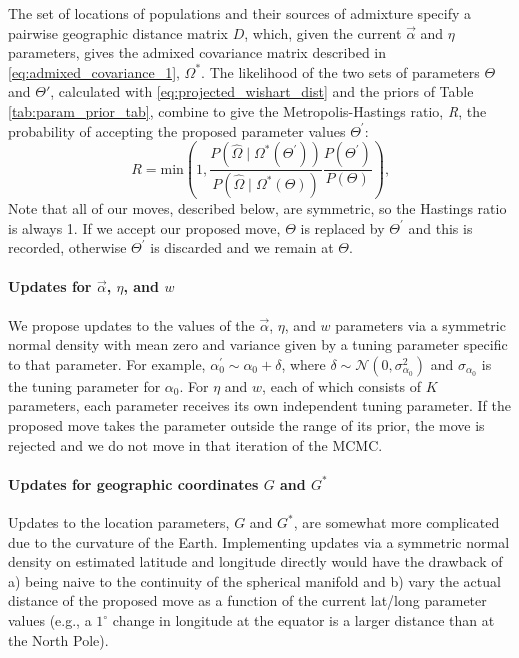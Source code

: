 \documentclass[12pt]{article}
\newcommand{\identifyadmixsource}[1]{{#1^{*}}}
\begin{document}
The set of locations of populations and their sources of admixture specify a pairwise geographic distance matrix $D$, 
which, given the current $\vec{\alpha}$ and $\eta$ parameters, 
gives the admixed covariance matrix described in \eqref{eq:admixed_covariance_1}, $\identifyadmixsource{\Omega}$.  
The likelihood of the two sets of parameters $\Theta$ and $\Theta'$, 
calculated with \eqref{eq:projected_wishart_dist} and the priors of Table \ref{tab:param_prior_tab},
combine to give the Metropolis-Hastings ratio, \emph{R}, the probability of accepting the proposed parameter values $\Theta^{\prime}$:
\begin{equation}
R = \text{min}\left(1, \frac{P(\widehat{\Omega} \mid \identifyadmixsource{\Omega}(\Theta^{\prime}))} {P(\widehat{\Omega} \mid \identifyadmixsource{\Omega}(\Theta))} 
				\frac{P(\Theta^{\prime})}{P(\Theta)} 	\right) \text{,}
\label{eq:MH_algorithm}
\end{equation}
Note that all of our moves, described below, are symmetric, so the Hastings ratio is always 1.
If we accept our proposed move, $\Theta$ is replaced by $\Theta^{\prime}$ and this is recorded, otherwise $\Theta^{\prime}$ is discarded and we remain at $\Theta$. 

\paragraph{Updates for $\vec{\alpha}$, $\eta$, and $w$}
We propose updates to the values of the $\vec{\alpha}$, $\eta$, and $w$ parameters via a symmetric normal density with mean zero 
and variance given by a tuning parameter specific to that parameter.  
For example, $\alpha_0^{\prime} \sim \alpha_0 + \delta$, 
where $\delta \sim \mathcal{N}(0,\sigma_{\alpha_0}^2)$ and $\sigma_{\alpha_0}$ is the tuning parameter for $\alpha_0$.  
For $\eta$ and $w$, each of which consists of $K$ parameters, each parameter receives its own independent tuning parameter. 
If the proposed move takes the parameter outside the range of its prior, the move is rejected and we do not move in that iteration of the MCMC.

\paragraph{Updates for geographic coordinates $G$ and $\identifyadmixsource{G}$} Updates to the location parameters, $G$ and $\identifyadmixsource{G}$, are somewhat more complicated due to the curvature of the Earth.  Implementing updates via a symmetric normal density on estimated latitude and longitude directly would have the drawback of a) being naive to the continuity of the spherical manifold and b) vary the actual distance of the proposed move as a function of the current lat/long parameter values (e.g., a $1^{\circ}$ change in longitude at the equator is a larger distance than at the North Pole).  
\end{document}

